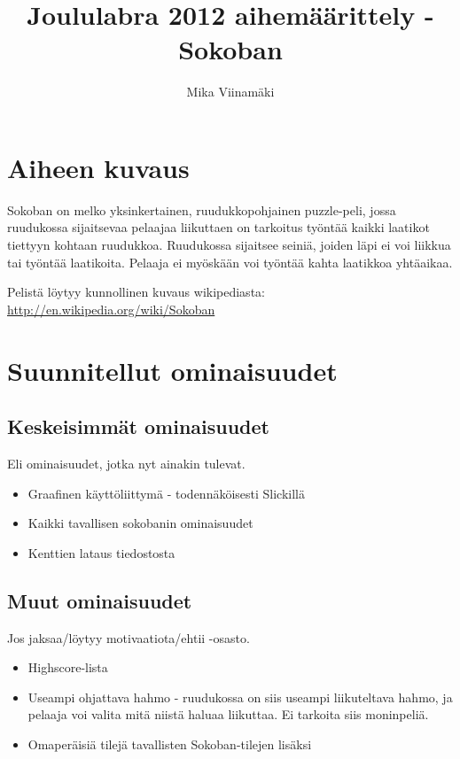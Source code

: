 \documentclass{article}
\begin{document}
\title{Joululabra 2012 aihemäärittely - Sokoban}
\author{Mika Viinamäki}
\maketitle

\section*{Aiheen kuvaus}
Sokoban on melko yksinkertainen, ruudukkopohjainen puzzle-peli, jossa ruudukossa sijaitsevaa pelaajaa liikuttaen on tarkoitus työntää kaikki laatikot tiettyyn kohtaan ruudukkoa. Ruudukossa sijaitsee seiniä, joiden läpi ei voi liikkua tai työntää laatikoita. Pelaaja ei myöskään voi työntää kahta laatikkoa yhtäaikaa.
    
Pelistä löytyy kunnollinen kuvaus wikipediasta: \url{http://en.wikipedia.org/wiki/Sokoban}
    
\section*{Suunnitellut ominaisuudet}

\subsection*{Keskeisimmät ominaisuudet}

Eli ominaisuudet, jotka nyt ainakin tulevat.

\begin{itemize}
    \item Graafinen käyttöliittymä - todennäköisesti Slickillä
    \item Kaikki tavallisen sokobanin ominaisuudet
    \item Kenttien lataus tiedostosta
\end{itemize}

\subsection*{Muut ominaisuudet}

Jos jaksaa/löytyy motivaatiota/ehtii -osasto.

\begin{itemize}
    \item Highscore-lista
    \item Useampi ohjattava hahmo - ruudukossa on siis useampi liikuteltava hahmo, ja pelaaja voi valita mitä niistä haluaa liikuttaa. Ei tarkoita siis moninpeliä. 
    \item Omaperäisiä tilejä tavallisten Sokoban-tilejen lisäksi
\end{itemize}
\end{document}
